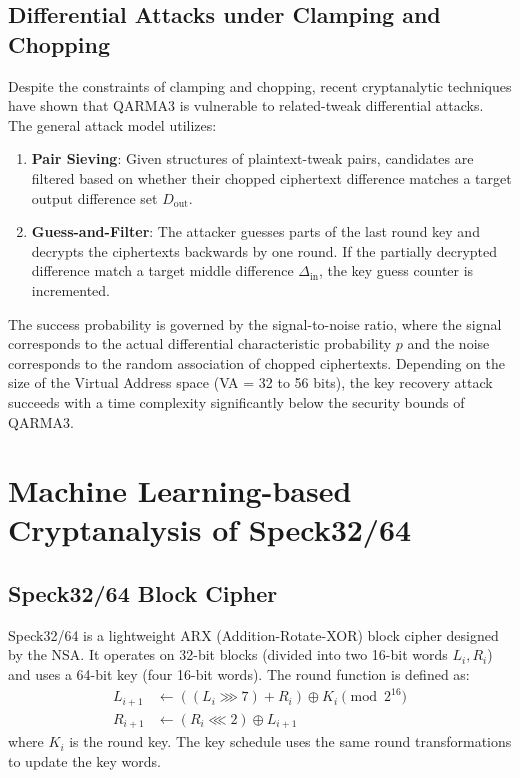\documentclass{article}
\begin{document}
\subsection{Differential Attacks under Clamping and Chopping}
Despite the constraints of clamping and chopping, recent cryptanalytic techniques have shown that QARMA3 is vulnerable to related-tweak differential attacks. The general attack model utilizes:
\begin{enumerate}
    \item \textbf{Pair Sieving}: Given structures of plaintext-tweak pairs, candidates are filtered based on whether their chopped ciphertext difference matches a target output difference set $D_{\text{out}}$.
    \item \textbf{Guess-and-Filter}: The attacker guesses parts of the last round key and decrypts the ciphertexts backwards by one round. If the partially decrypted difference match a target middle difference $\Delta_{\text{in}}$, the key guess counter is incremented.
\end{enumerate}
The success probability is governed by the signal-to-noise ratio, where the signal corresponds to the actual differential characteristic probability $p$ and the noise corresponds to the random association of chopped ciphertexts. Depending on the size of the Virtual Address space (VA = 32 to 56 bits), the key recovery attack succeeds with a time complexity significantly below the security bounds of QARMA3.

\section{Machine Learning-based Cryptanalysis of Speck32/64}

\subsection{Speck32/64 Block Cipher}
Speck32/64 is a lightweight ARX (Addition-Rotate-XOR) block cipher designed by the NSA. It operates on 32-bit blocks (divided into two 16-bit words $L_i, R_i$) and uses a 64-bit key (four 16-bit words). The round function is defined as:
\begin{align*}
    L_{i+1} &\gets ((L_i \ggg 7) + R_i) \oplus K_i \pmod{2^{16}} \\
    R_{i+1} &\gets (R_i \lll 2) \oplus L_{i+1}
\end{align*}
where $K_i$ is the round key. The key schedule uses the same round transformations to update the key words.
\end{document}
